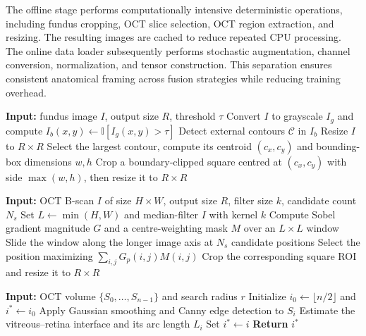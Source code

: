 \documentclass{ieeeaccess}
\begin{document}
The offline stage performs computationally intensive deterministic operations, including fundus cropping, OCT slice selection, OCT region extraction, and resizing. The resulting images are cached to reduce repeated CPU processing. The online data loader subsequently performs stochastic augmentation, channel conversion, normalization, and tensor construction. This separation ensures consistent anatomical framing across fusion strategies while reducing training overhead.

\begin{algorithm}[!t]
    \caption{Field-of-view-centered fundus ROI extraction}
    \label{alg:fundus_roi}
    \begin{algorithmic}[1]
        \STATE \textbf{Input:} fundus image $I$, output size $R$, threshold $\tau$
        \STATE Convert $I$ to grayscale $I_g$ and compute $I_b(x,y)\leftarrow\mathbb{I}[I_g(x,y)>\tau]$
        \STATE Detect external contours $\mathcal{C}$ in $I_b$
        \STATE Resize $I$ to $R\times R$
        \ELSE
        \STATE Select the largest contour, compute its centroid $(c_x,c_y)$ and bounding-box dimensions $w,h$
        \STATE Crop a boundary-clipped square centred at $(c_x,c_y)$ with side $\max(w,h)$, then resize it to $R\times R$
        \ENDIF
    \end{algorithmic}
\end{algorithm}

\begin{algorithm}[!t]
    \caption{Weighted gradient-based OCT ROI selection}
    \label{alg:oct_roi}
    \begin{algorithmic}[1]
        \STATE \textbf{Input:} OCT B-scan $I$ of size $H\times W$, output size $R$, filter size $k$, candidate count $N_s$
        \STATE Set $L\leftarrow\min(H,W)$ and median-filter $I$ with kernel $k$
        \STATE Compute Sobel gradient magnitude $G$ and a centre-weighting mask $M$ over an $L\times L$ window
        \STATE Slide the window along the longer image axis at $N_s$ candidate positions
        \STATE Select the position maximizing $\sum_{i,j}G_p(i,j)M(i,j)$
        \STATE Crop the corresponding square ROI and resize it to $R\times R$
    \end{algorithmic}
\end{algorithm}

\begin{algorithm}[!t]
    \caption{Foveal-center slice estimation}
    \label{alg:foveal_detection}
    \begin{algorithmic}[1]
        \STATE \textbf{Input:} OCT volume $\{S_0,\ldots,S_{n-1}\}$ and search radius $r$
        \STATE Initialize $i_0\leftarrow\lfloor n/2\rfloor$ and $i^*\leftarrow i_0$
        \STATE Apply Gaussian smoothing and Canny edge detection to $S_i$
        \STATE Estimate the vitreous--retina interface and its arc length $L_i$
        \STATE Set $i^*\leftarrow i$
        \ENDIF
        \ENDFOR
        \STATE \textbf{Return} $i^*$
    \end{algorithmic}
\end{algorithm}
\end{document}
